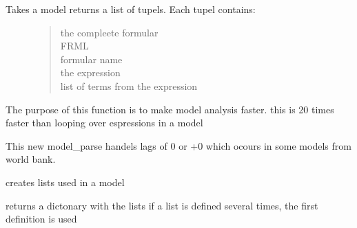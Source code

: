\documentclass[letterpaper,10pt,english]{sphinxmanual}
\begin{document}

\begin{fulllineitems}
\label{\detokenize{core/modelpattern:modelpattern.model_parse}}
\pysigstartsignatures
{}
\pysigstopsignatures\begin{description}
\item[{Takes a model returns a list of tupels. Each tupel contains:}] \leavevmode\begin{quote}\begin{description}
\item[{the compleete formular}] \leavevmode
\item[{FRML}] \leavevmode
\item[{formular name}] \leavevmode
\item[{the expression}] \leavevmode
\item[{list of terms from the expression}] \leavevmode
\end{description}\end{quote}

\end{description}

\sphinxAtStartPar
The purpose of this function is to make model analysis faster. this is 20 times faster than looping over espressions in a model

\sphinxAtStartPar
This new model\_parse handels lags of \sphinxhyphen{}0 or +0 which ocours in some models from world bank.

\end{fulllineitems}


\begin{fulllineitems}
\label{\detokenize{core/modelpattern:modelpattern.list_extract}}
\pysigstartsignatures
{}
\pysigstopsignatures
\sphinxAtStartPar
creates lists used in a model

\sphinxAtStartPar
returns a dictonary with the lists
if a list is defined several times, the first definition is used

\end{fulllineitems}
\end{document}
